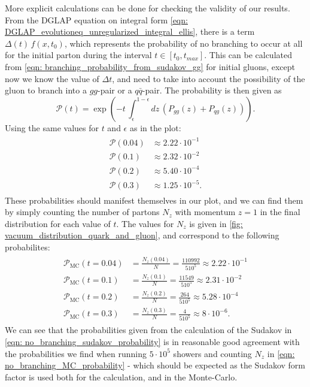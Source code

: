 \documentclass[main.tex]{subfiles}
\begin{document}
More explicit calculations can be done for checking the validity of our results. From the DGLAP equation on integral form \autoref{eqn: DGLAP_evolutioneq_unregularized_integral_ellis}, there is a term \(\Delta(t)\, f(x,t_0)\), which represents the probability of no branching to occur at all for the initial parton during the interval \(t\in[t_0, t_{max}]\). This can be calculated from \autoref{eqn: branching_probability_from_sudakov_gg} for initial gluons, except now we know the value of \(\Delta t\), and need to take into account the possibility of the gluon to branch into a \(gg\)-pair or a \(q\bar q\)-pair. The probability is then given as
\begin{equation}
    \mathcal{P}(t) = \exp \left(-t\, \int_{\epsilon}^{1-\epsilon}dz\, (P_{gg}(z) + P_{qg}(z)) \right).
\end{equation}
Using the same values for \(t\) and \(\epsilon\) as in the plot:
\begin{align}\label{eqn: no_branching_sudakov_probability}
    \begin{split}
        \mathcal{P}(0.04) &\approx 2.22\cdot 10^{-1} \\
        \mathcal{P}(0.1) &\approx 2.32\cdot 10^{-2} \\
        \mathcal{P}(0.2)&\approx 5.40\cdot 10^{-4} \\
        \mathcal{P}(0.3) &\approx 1.25\cdot 10^{-5}.
    \end{split}
\end{align}
These probabilities should manifest themselves in our plot, and we can find them by simply counting the number of partons \(N_z\) with momentum \(z=1\) in the final distribution for each value of \(t\). The values for \(N_z\) is given in \autoref{fig: vacuum_distribution_quark_and_gluon}, and correspond to the following probabilites:
\begin{align}\label{eqn: no_branching_MC_probability}
    \begin{split}
        \mathcal{P}_{\text{MC}}(t=0.04) &= \frac{N_z(0.04)}{N} = \frac{110992}{5 10^{5}} \approx 2.22 \cdot10^{-1} \\
        \mathcal{P}_{\text{MC}}(t=0.1) &= \frac{N_z(0.1)}{N} = \frac{11549}{5 10^{5}} \approx 2.31\cdot 10^{-2} \\
        \mathcal{P}_{\text{MC}}(t=0.2) &= \frac{N_z(0.2)}{N} = \frac{264}{5 10^{5}} \approx 5.28\cdot 10^{-4} \\
        \mathcal{P}_{\text{MC}}(t=0.3) &= \frac{N_z(0.3)}{N} = \frac{4}{5 10^{5}} \approx 8\cdot 10^{-6}.
    \end{split}
\end{align}
We can see that the probabilities given from the calculation of the Sudakov in \autoref{eqn: no_branching_sudakov_probability} is in reasonable good agreement with the probabilities we find when running \(5 \cdot 10^5\) showers and counting \(N_z\) in \autoref{eqn: no_branching_MC_probability} - which should be expected as the Sudakov form factor is used both for the calculation, and in the Monte-Carlo.
\end{document}
